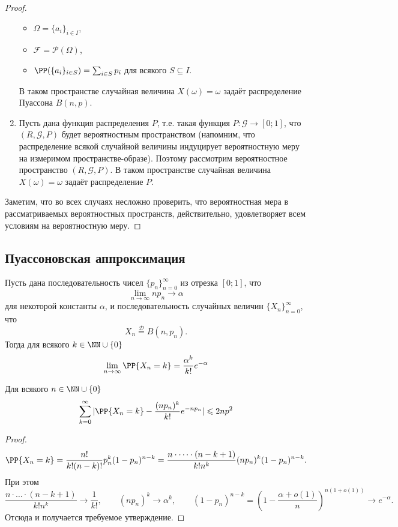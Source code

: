 \documentclass[12pt,a4paper]{article}
\newcommand{\Deq}{\mathrel{\stackrel{\mathcal{D}}{=}}}
\begin{document}
\begin{proof}
\begin{enumerate}
                \begin{itemize}
                    \item $\Omega = \{a_i\}_{i \in I}$,
                    \item $\mathcal{F} = \mathcal{P}(\Omega)$,
                    \item $\PP(\{a_i\}_{i \in S}) = \sum_{i \in S} p_i$ для всякого $S \subseteq I$.
                \end{itemize}
                В таком пространстве случайная величина $X(\omega) = \omega$ задаёт распределение Пуассона $B(n, p)$.
            \item Пусть дана функция распределения $P$, т.е. такая функция $P: \mathcal{G} \to [0; 1]$, что $(R, \mathcal{G}, P)$ будет вероятностным пространством (напомним, что распределение всякой случайной величины индуцирует вероятностную меру на измеримом пространстве-образе). Поэтому рассмотрим вероятностное пространство $(R, \mathcal{G}, P)$. В таком пространстве случайная величина $X(\omega) = \omega$ задаёт распределение $P$.
        \end{enumerate}
        Заметим, что во всех случаях несложно проверить, что вероятностная мера в рассматриваемых вероятностных пространств, действительно, удовлетворяет всем условиям на вероятностную меру.
    \end{proof}

    \subsection{Пуассоновская аппроксимация}

    \begin{theorem}
        Пусть дана последовательность чисел $\{p_n\}_{n=0}^\infty$ из отрезка $[0; 1]$, что
        \[\lim_{n \to \infty} n p_n \to \alpha\]
        для некоторой константы $\alpha$, и последовательность случайных величин $\{X_n\}_{n=0}^\infty$, что
        \[X_n \Deq B(n, p_n).\]
        Тогда для всякого $k \in \NN \cup \{0\}$
        \[\lim_{n \to \infty} \PP\{X_n = k\} = \frac{\alpha^k}{k!}e^{-\alpha}\]
            \item Для всякого $n \in \NN \cup \{0\}$
                \[\sum_{k=0}^\infty |\PP\{X_n = k\} - \frac{(np_n)^k}{k!} e^{-np_n}| \leqslant 2np^2\]
            \item 
    \end{theorem}

    \begin{proof}
        \[
            \PP\{X_n = k\}
            = \frac{n!}{k! (n-k)!} p_n^k (1-p_n)^{n-k}
            = \frac{n \cdot \dots \cdot (n-k+1)}{k! n^k} (np_n)^k (1-p_n)^{n-k}.
        \]
        При этом
        \[
            \frac{n \cdot \dots \cdot (n-k+1)}{k! n^k} \to \frac{1}{k!},
            \qquad
            (np_n)^k \to \alpha^k,
            \qquad (1-p_n)^{n-k} = \left(1 - \frac{\alpha + o(1)}{n}\right)^{n(1 + o(1))}
            \to e^{-\alpha}.
        \]
        Отсюда и получается требуемое утверждение.
    \end{proof}
\end{document}
